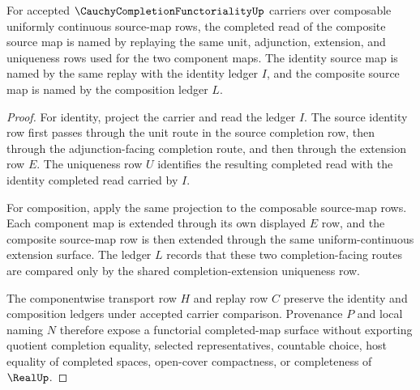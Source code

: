 \begin{theorem}
\label{thm:cauchy-completion-functoriality-composition}
For accepted $\CauchyCompletionFunctorialityUp$ carriers over composable uniformly continuous source-map rows, the completed read of the composite source map is named by replaying the same unit, adjunction, extension, and uniqueness rows used for the two component maps. The identity source map is named by the same replay with the identity ledger $I$, and the composite source map is named by the composition ledger $L$.
\end{theorem}
\begin{proof}
For identity, project the carrier and read the ledger $I$. The source identity row first passes through the unit route in the source completion row, then through the adjunction-facing completion route, and then through the extension row $E$. The uniqueness row $U$ identifies the resulting completed read with the identity completed read carried by $I$.

For composition, apply the same projection to the composable source-map rows. Each component map is extended through its own displayed $E$ row, and the composite source-map row is then extended through the same uniform-continuous extension surface. The ledger $L$ records that these two completion-facing routes are compared only by the shared completion-extension uniqueness row.

The componentwise transport row $H$ and replay row $C$ preserve the identity and composition ledgers under accepted carrier comparison. Provenance $P$ and local naming $N$ therefore expose a functorial completed-map surface without exporting quotient completion equality, selected representatives, countable choice, host equality of completed spaces, open-cover compactness, or completeness of $\RealUp$.
\end{proof}

